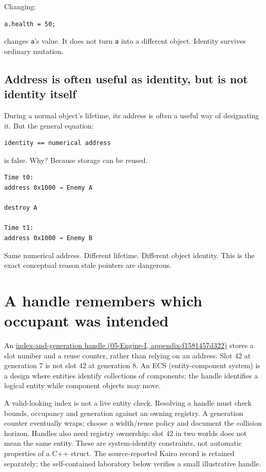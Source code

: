 Changing:

\begin{verbatim}
a.health = 50;
\end{verbatim}

changes \texttt{a}'s value. It does not turn \texttt{a} into a different object. Identity survives ordinary mutation.

\subsection{Address is often useful as identity, but is not identity itself}\label{01-foundations-i-ch002-address-is-often-useful-as-identity-but-is-not-identity-itself}

During a normal object's lifetime, its address is often a useful way of designating it. But the general equation:

\begin{verbatim}
identity == numerical address
\end{verbatim}

is false. Why? Because storage can be reused.

\begin{verbatim}
Time t0:
address 0x1000 → Enemy A

destroy A

Time t1:
address 0x1000 → Enemy B
\end{verbatim}

Same numerical address. Different lifetime. Different object identity. This is the exact conceptual reason stale pointers are dangerous.

\section{A handle remembers which occupant was intended}\label{01-foundations-i-ch002-a-handle-remembers-which-occupant-was-intended}

An \href{../05-Engine-I/main.pdf\#nameddest=appendix-f1581457d322}{index-and-generation handle (05-Engine-I, appendix-f1581457d322)} stores a slot number and a reuse counter, rather than relying on an address. Slot 42 at generation 7 is not slot 42 at generation 8. An ECS (entity-component system) is a design where entities identify collections of components; the handle identifies a logical entity while component objects may move.

A valid-looking index is not a live entity check. Resolving a handle must check bounds, occupancy and generation against an owning registry. A generation counter eventually wraps; choose a width/reuse policy and document the collision horizon. Handles also need registry ownership: slot 42 in two worlds does not mean the same entity. These are system-identity constraints, not automatic properties of a C++ struct. The source-reported Kairo record is retained separately; the self-contained laboratory below verifies a small illustrative handle.


